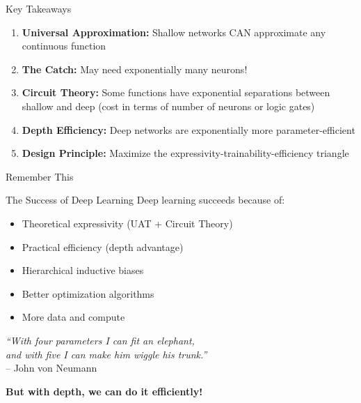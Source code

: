 \documentclass[xcolor=svgnames, 10pt, handout, standalone]{beamer}
\newcommand{\1}{\mathbf{1}}
\begin{document}
\begin{frame}{Key Takeaways}
\begin{enumerate}
    \item<1-> \textbf{Universal Approximation:} Shallow networks CAN approximate any continuous function
    \vspace{0.3cm}
    \item<2-> \textbf{The Catch:} May need exponentially many neurons!
    \vspace{0.3cm}
    \item<3-> \textbf{Circuit Theory:} Some functions have exponential separations between shallow and deep (cost in terms of number of neurons or logic gates)
    \vspace{0.3cm}
    \item<4-> \textbf{Depth Efficiency:} Deep networks are exponentially more parameter-efficient
    \vspace{0.3cm}
    \item<5-> \textbf{Design Principle:} Maximize the expressivity-trainability-efficiency triangle
\end{enumerate}
\end{frame}

\begin{frame}{Remember This}
\begin{block}{The Success of Deep Learning}
Deep learning succeeds because of:
\begin{itemize}
    \item Theoretical expressivity (UAT + Circuit Theory)
    \item Practical efficiency (depth advantage)
    \item Hierarchical inductive biases
    \item Better optimization algorithms
    \item More data and compute
\end{itemize}
\end{block}

\pause
\vspace{0.5cm}
\begin{center}
\textit{``With four parameters I can fit an elephant,\\
and with five I can make him wiggle his trunk.''}\\
-- John von Neumann

\vspace{0.3cm}
\textbf{But with depth, we can do it efficiently!}
\end{center}
\end{frame}
\end{document}

